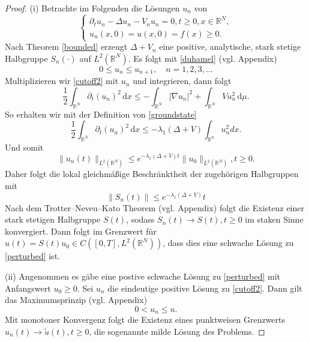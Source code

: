\documentclass[11pt,twoside,a4paper]{article}
\theoremstyle{break}
\begin{document}
\begin{proof}
(i) Betrachte im Folgenden die L\"osungen $u_n$ von
\begin{equation}\label{cutoff2}
\begin{cases}
\partial_t u_n - \Delta u_n - V_n u_n =0, t\ge 0, x\in \mathbb R^N,\\
u_n(x,0)=u(x,0)=f(x)\ge 0.
\end{cases}
\end{equation}
Nach Theorem \ref{bounded} erzeugt $\Delta + V_n$ eine positive, analytische, stark stetige Halbgruppe $S_n(\cdot)$ auf $L^2(\mathbb R^N)$. Es folgt mit \eqref{duhamel} (vgl. Appendix)
\begin{equation}\label{beh1}
0 \le u_n \le u_{n+1}, \quad n=1,2,3,\ldots
\end{equation}
Multiplizieren wir \eqref{cutoff2} mit $u_n$ und integrieren, dann folgt
\begin{equation}
\frac{1}{2} \int_{\mathbb R^N} \partial_t (u_n)^2\, \mathrm dx \le - \int_{\mathbb R^N} |\nabla u_n|^2 + \int_{\mathbb R^N} V u_n^2\, \mathrm d\mu.
\end{equation}
So erhalten wir mit der Definition von \eqref{groundstate}
\begin{equation}
\frac{1}{2} \int_{\mathbb R^N} \partial_t (u_n)^2\, \mathrm dx \le -\lambda_1(\Delta+V) \int_{\mathbb R^n} u_n^2 dx.
\end{equation}
Und somit
\begin{equation}
\|u_n(t)\|_{L^2(\mathbb R^N)} \le e^{-\lambda_1(\Delta +V) t} \|u_0\|_{L^2(\mathbb R^N)}, t\ge 0.
\end{equation}
Daher folgt die lokal gleichm\"a{\ss}ige Beschr\"anktheit der zugeh\"origen Halbgruppen mit
\begin{equation}
\|S_n(t)\| \le e^{-\lambda_1(\Delta + V)}t
\end{equation}
Nach dem Trotter--Neveu--Kato Theorem (vgl. Appendix) folgt die Existenz einer stark stetigen Halbgruppe $S(t)$, sodass $S_n(t) \to S(t), t\ge 0$ im staken Sinne konvergiert.  Dann folgt im Grenzwert f\"ur $u(t) = S(t) u_0\in C([0,T],L^2(\mathbb R^N))$, dass dies eine schwache L\"osung zu \eqref{perturbed} ist.  

(ii) Angenommen es g\"abe eine postive schwache L\"osung zu \eqref{perturbed} mit Anfangswert $u_0\ge 0$.  Sei $u_n$ die eindeutige positive L\"osung zu \eqref{cutoff2}. Dann gilt das Maximumsprinzip (vgl. Appendix)
\begin{equation}\label{maximum}
0<u_n \le u.
\end{equation}
Mit monotoner Konvergenz folgt die Existenz eines punktweisen Grenzwerts $u_n(t)\to \tilde u(t), t\ge 0$, die sogenannte milde L\"osung des Problems.  


\end{proof}
\end{document}
